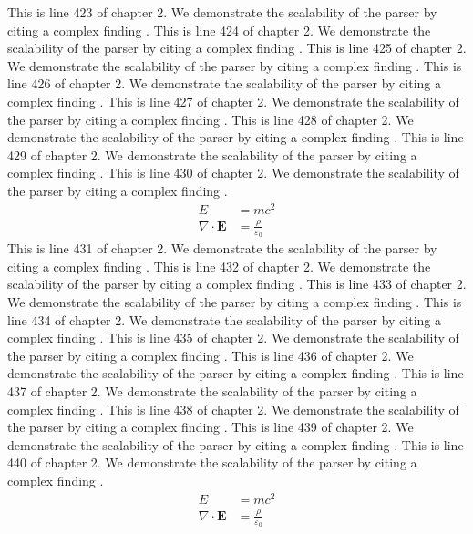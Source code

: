This is line 423 of chapter 2. We demonstrate the scalability of the parser by citing a complex finding \cite{ref2_423}.
This is line 424 of chapter 2. We demonstrate the scalability of the parser by citing a complex finding \cite{ref2_424}.
This is line 425 of chapter 2. We demonstrate the scalability of the parser by citing a complex finding \cite{ref2_425}.
This is line 426 of chapter 2. We demonstrate the scalability of the parser by citing a complex finding \cite{ref2_426}.
This is line 427 of chapter 2. We demonstrate the scalability of the parser by citing a complex finding \cite{ref2_427}.
This is line 428 of chapter 2. We demonstrate the scalability of the parser by citing a complex finding \cite{ref2_428}.
This is line 429 of chapter 2. We demonstrate the scalability of the parser by citing a complex finding \cite{ref2_429}.
This is line 430 of chapter 2. We demonstrate the scalability of the parser by citing a complex finding \cite{ref2_430}.
\begin{align*}
  E &= mc^2 \\
  \nabla \cdot \mathbf{E} &= \frac{\rho}{\varepsilon_0}
\end{align*}
This is line 431 of chapter 2. We demonstrate the scalability of the parser by citing a complex finding \cite{ref2_431}.
This is line 432 of chapter 2. We demonstrate the scalability of the parser by citing a complex finding \cite{ref2_432}.
This is line 433 of chapter 2. We demonstrate the scalability of the parser by citing a complex finding \cite{ref2_433}.
This is line 434 of chapter 2. We demonstrate the scalability of the parser by citing a complex finding \cite{ref2_434}.
This is line 435 of chapter 2. We demonstrate the scalability of the parser by citing a complex finding \cite{ref2_435}.
This is line 436 of chapter 2. We demonstrate the scalability of the parser by citing a complex finding \cite{ref2_436}.
This is line 437 of chapter 2. We demonstrate the scalability of the parser by citing a complex finding \cite{ref2_437}.
This is line 438 of chapter 2. We demonstrate the scalability of the parser by citing a complex finding \cite{ref2_438}.
This is line 439 of chapter 2. We demonstrate the scalability of the parser by citing a complex finding \cite{ref2_439}.
This is line 440 of chapter 2. We demonstrate the scalability of the parser by citing a complex finding \cite{ref2_440}.
\begin{align*}
  E &= mc^2 \\
  \nabla \cdot \mathbf{E} &= \frac{\rho}{\varepsilon_0}
\end{align*}
